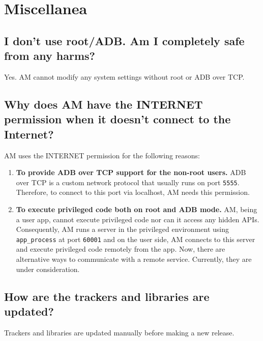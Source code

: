 \section{Miscellanea}\label{sec:faq:miscellanea}

\subsection{I don't use root/ADB. Am I completely safe from any harms?}
Yes. AM cannot modify any system settings without root or ADB over TCP\@.

\subsection{Why does AM have the INTERNET permission when it doesn't connect to the Internet?}
AM uses the INTERNET permission for the following reasons:
\begin{enumerate}
    \item \textbf{To provide ADB over TCP support for the non-root users.} ADB over TCP is a custom network protocol
    that usually runs on port \texttt{5555}. Therefore, to connect to this port via localhost, AM needs this permission.
    \item \textbf{To execute privileged code both on root and ADB mode.} AM, being a user app, cannot execute privileged
    code nor can it access any hidden APIs. Consequently, AM runs a server in the privileged environment using
    \texttt{app\_process} at port \texttt{60001} and on the user side, AM connects to this server and execute privileged
    code remotely from the app. Now, there are alternative ways to communicate with a remote service. Currently, they
    are under consideration.
\end{enumerate}

\subsection{How are the trackers and libraries are updated?}
Trackers and libraries are updated manually before making a new release.

